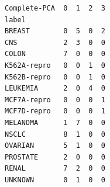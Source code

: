 \documentclass[11pt]{article}
\makeatletter
\newcommand{\boxspacing}{\kern\kvtcb@left@rule\kern\kvtcb@boxsep}
\newcommand{\prompt}[4]{
        {\ttfamily\llap{{\color{#2}[#3]:\hspace{3pt}#4}}\vspace{-\baselineskip}}
    }
\makeatother
\begin{document}
            \begin{tcolorbox}[breakable, size=fbox, boxrule=.5pt, pad at break*=1mm, opacityfill=0]
\prompt{Out}{outcolor}{58}{\boxspacing}
\begin{Verbatim}[commandchars=\\\{\}]
Complete-PCA  0  1  2  3
label
BREAST        0  5  0  2
CNS           2  3  0  0
COLON         7  0  0  0
K562A-repro   0  0  1  0
K562B-repro   0  0  1  0
LEUKEMIA      2  0  4  0
MCF7A-repro   0  0  0  1
MCF7D-repro   0  0  0  1
MELANOMA      1  7  0  0
NSCLC         8  1  0  0
OVARIAN       5  1  0  0
PROSTATE      2  0  0  0
RENAL         7  2  0  0
UNKNOWN       0  1  0  0
\end{Verbatim}
\end{tcolorbox}
        
    \begin{center}
    \end{center}
    { \hspace*{\fill} \\}
    
    


    
    
    
\end{document}
